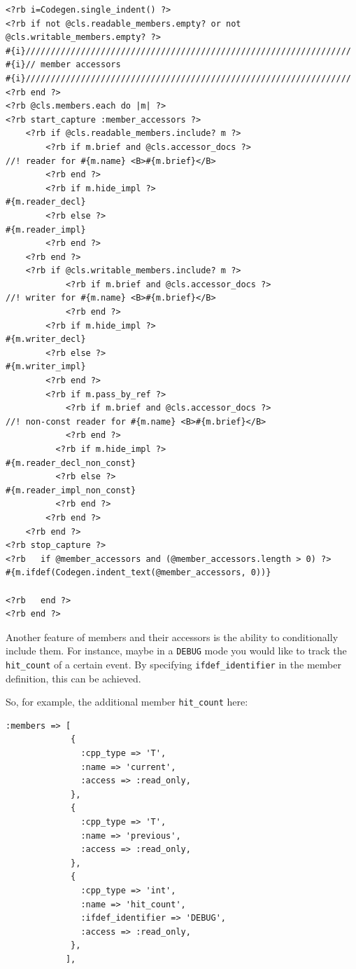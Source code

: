 \documentclass[11pt]{article}
\begin{document}
\lstset{language=Ruby}
\begin{lstlisting}
<?rb i=Codegen.single_indent() ?>
<?rb if not @cls.readable_members.empty? or not @cls.writable_members.empty? ?>
#{i}/////////////////////////////////////////////////////////////////
#{i}// member accessors
#{i}/////////////////////////////////////////////////////////////////
<?rb end ?>
<?rb @cls.members.each do |m| ?>
<?rb start_capture :member_accessors ?>
    <?rb if @cls.readable_members.include? m ?>
        <?rb if m.brief and @cls.accessor_docs ?>
//! reader for #{m.name} <B>#{m.brief}</B>
        <?rb end ?>
        <?rb if m.hide_impl ?>
#{m.reader_decl}
        <?rb else ?>        
#{m.reader_impl}
        <?rb end ?>
    <?rb end ?>
    <?rb if @cls.writable_members.include? m ?>
            <?rb if m.brief and @cls.accessor_docs ?>
//! writer for #{m.name} <B>#{m.brief}</B>
            <?rb end ?>
        <?rb if m.hide_impl ?>
#{m.writer_decl}
        <?rb else ?>        
#{m.writer_impl}
        <?rb end ?>
        <?rb if m.pass_by_ref ?>
            <?rb if m.brief and @cls.accessor_docs ?>
//! non-const reader for #{m.name} <B>#{m.brief}</B>
            <?rb end ?>
          <?rb if m.hide_impl ?>
#{m.reader_decl_non_const}
          <?rb else ?>        
#{m.reader_impl_non_const}
          <?rb end ?>
        <?rb end ?>
    <?rb end ?>
<?rb stop_capture ?>
<?rb   if @member_accessors and (@member_accessors.length > 0) ?>
#{m.ifdef(Codegen.indent_text(@member_accessors, 0))}

<?rb   end ?>
<?rb end ?>
\end{lstlisting}




  Another feature of members and their accessors is the ability to
  conditionally include them. For instance, maybe in a \texttt{DEBUG} mode
  you would like to track the \texttt{hit\_count} of a certain event. By
  specifying \texttt{ifdef\_identifier} in the member definition, this can be
  achieved.

  So, for example, the additional member \texttt{hit\_count} here:


\lstset{language=Ruby}
\begin{lstlisting}
:members => [
             { 
               :cpp_type => 'T',
               :name => 'current',
               :access => :read_only,
             },
             { 
               :cpp_type => 'T',
               :name => 'previous',
               :access => :read_only,
             },
             { 
               :cpp_type => 'int',
               :name => 'hit_count',
               :ifdef_identifier => 'DEBUG',
               :access => :read_only,
             },
            ],
\end{lstlisting}
\end{document}
